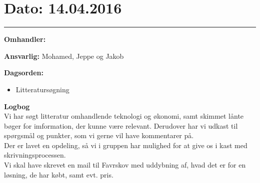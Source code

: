 \section{Dato: 14.04.2016}
\hrule

\textbf{Omhandler:}

\textbf{Ansvarlig:} Mohamed, Jeppe og Jakob

\textbf{Dagsorden:}
\begin{itemize}
	\item Litteratursøgning
\end{itemize}

\textbf{Logbog}
\\
Vi har søgt litteratur omhandlende teknologi og økonomi, samt skimmet lånte bøger for imformation, der kunne være relevant. Derudover har vi udkast til spørgsmål og punkter, som vi gerne vil have kommentarer på.\\Der er lavet en opdeling, så vi i gruppen har mulighed for at give os i kast med skrivningsprocessen.
\\ Vi skal have skrevet en mail til Favrskov med uddybning af, hvad det er for en løsning, de har købt, samt evt. pris.